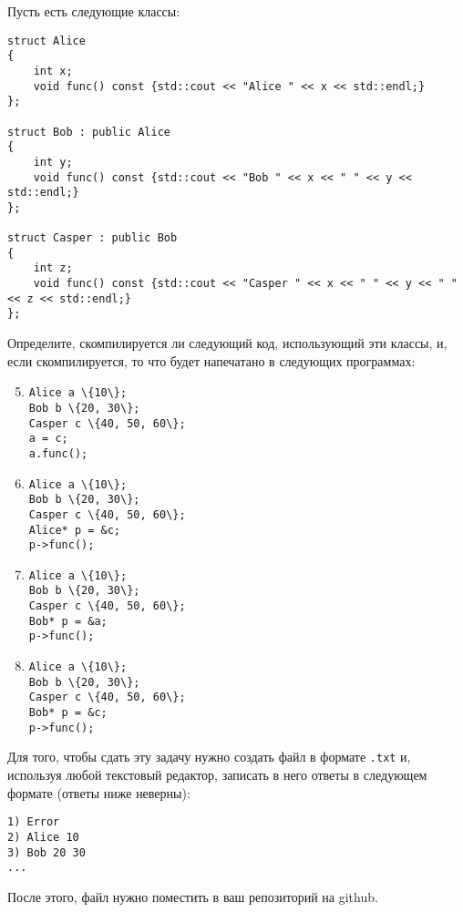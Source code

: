 \documentclass{article}
\begin{document}
Пусть есть следующие классы:
\begin{lstlisting}
struct Alice
{
	int x;
	void func() const {std::cout << "Alice " << x << std::endl;}
};

struct Bob : public Alice
{
	int y;
	void func() const {std::cout << "Bob " << x << " " << y << std::endl;}
};

struct Casper : public Bob
{
	int z;
	void func() const {std::cout << "Casper " << x << " " << y << " " << z << std::endl;}
};
\end{lstlisting}

Определите, скомпилируется ли следующий код, использующий эти классы, и, если скомпилируется, то что будет напечатано в следующих программах:
\begin{enumerate}
\setcounter{enumi}{4}
\item \begin{Verbatim}[commandchars=\\\{\}]
Alice a \{10\};
Bob b \{20, 30\};
Casper c \{40, 50, 60\};
a = c;
a.func();
\end{Verbatim}

\item \begin{Verbatim}[commandchars=\\\{\}]
Alice a \{10\};
Bob b \{20, 30\};
Casper c \{40, 50, 60\};
Alice* p = &c;
p->func();
\end{Verbatim}

\item \begin{Verbatim}[commandchars=\\\{\}]
Alice a \{10\};
Bob b \{20, 30\};
Casper c \{40, 50, 60\};
Bob* p = &a;
p->func();
\end{Verbatim}

\item \begin{Verbatim}[commandchars=\\\{\}]
Alice a \{10\};
Bob b \{20, 30\};
Casper c \{40, 50, 60\};
Bob* p = &c;
p->func();
\end{Verbatim}

\end{enumerate}


Для того, чтобы сдать эту задачу нужно создать файл в формате \texttt{.txt} и, используя любой текстовый редактор, записать в него ответы в следующем формате (ответы ниже неверны):
\begin{verbatim}
1) Error
2) Alice 10
3) Bob 20 30
...
\end{verbatim} 
После этого, файл нужно поместить в ваш репозиторий на github.
\end{document}
